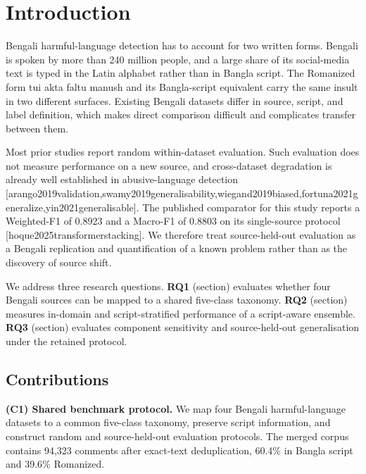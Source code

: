 \documentclass[11pt,a4paper]{article}
\def\citep#1{[#1]}%
\def\cref#1{section}%
\def\emph#1{#1}%
\begin{document}
\vspace{0.2em}

\section{Introduction}
\label{sec:introduction}

Bengali harmful-language detection has to account for two written forms. Bengali is spoken by more than 240 million people, and a large share of its social-media text is typed in the Latin alphabet rather than in Bangla script. The Romanized form \emph{tui akta faltu manush} and its Bangla-script equivalent carry the same insult in two different surfaces. Existing Bengali datasets differ in source, script, and label definition, which makes direct comparison difficult and complicates transfer between them.

Most prior studies report random within-dataset evaluation. Such evaluation does not measure performance on a new source, and cross-dataset degradation is already well established in abusive-language detection \citep{arango2019validation,swamy2019generalisability,wiegand2019biased,fortuna2021generalize,yin2021generalisable}. The published comparator for this study reports a Weighted-F1 of 0.8923 and a Macro-F1 of 0.8803 on its single-source protocol \citep{hoque2025transformerstacking}. We therefore treat source-held-out evaluation as a Bengali replication and quantification of a known problem rather than as the discovery of source shift.

We address three research questions. \textbf{RQ1} (\cref{sec:benchmark}) evaluates whether four Bengali sources can be mapped to a shared five-class taxonomy. \textbf{RQ2} (\cref{sec:main-results,sec:perclass-results,sec:scriptmask-results}) measures in-domain and script-stratified performance of a script-aware ensemble. \textbf{RQ3} (\cref{sec:ablation-results,sec:robustness-results}) evaluates component sensitivity and source-held-out generalisation under the retained protocol.

\subsection{Contributions}
\label{sec:contributions}

\textbf{(C1) Shared benchmark protocol.} We map four Bengali harmful-language datasets to a common five-class taxonomy, preserve script information, and construct random and source-held-out evaluation protocols. The merged corpus contains 94{,}323 comments after exact-text deduplication, 60.4\% in Bangla script and 39.6\% Romanized.
\end{document}
